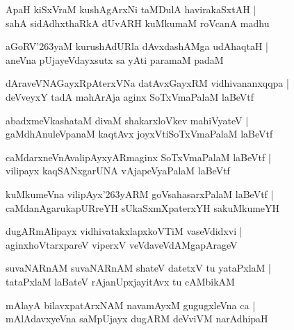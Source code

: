 \documentclass[twoside,12pt,openright]{book}
\def\S{\char'263}
\newcounter{shloka}[chapter]
\begin{document}
\begin{shloka}%
ApaH kiSxVraM kushAgArxNi taMDulA havirakaSxtAH |\\
sahA sidAdhxthaRkA dUvARH kuMkumaM roVcanA madhu 
\end{shloka}

\begin{shloka}%
aGoRV\S yaM kurushAdURla dAvxdashAMga udAhaqtaH |\\
aneVna pUjayeVdayxsutx sa yAti paramaM padaM 
\end{shloka}

\begin{shloka}%
dAraveVNAGayxRpAterxVNa datAvxGayxRM vidhivananxqqpa |\\
deVveyxY tadA mahArAja aginx SoTxVmaPalaM laBeVtf 
\end{shloka}

\begin{shloka}%
abadxmeVkashataM divaM shakarxloVkev mahiVyateV |\\
gaMdhAnuleVpanaM kaqtAvx joyxVtiSoTxVmaPalaM laBeVtf 
\end{shloka}

\begin{shloka}%
caMdarxneVnAvalipAyxyARmaginx SoTxVmaPalaM laBeVtf |\\
vilipayx kaqSANxgarUNA vAjapeVyaPalaM laBeVtf
\end{shloka}

\begin{shloka}%
kuMkumeVna vilipAyx\S yARM goVsahasarxPalaM laBeVtf |\\
caMdanAgarukapURreYH sUkaSxmXpaterxYH sakuMkumeYH 
\end{shloka}

\begin{shloka}%
dugARmAlipayx vidhivatakxlapxkoVTiM vaseVdidxvi |\\
aginxhoVtarxpareV viperxV veVdaveVdAMgapArageV 
\end{shloka}

\begin{shloka}%
suvaNARnAM suvaNARnAM shateV datetxV tu yataPxlaM |\\
tataPxlaM laBateV rAjanUpxjayitAvx tu cAMbikAM 
\end{shloka}

\begin{shloka}%
mAlayA bilavxpatArxNAM navamAyxM gugugxleVna ca |\\
mAlAdavxyeVna saMpUjayx dugARM deVviVM narAdhipaH 
\end{shloka}
\end{document}
